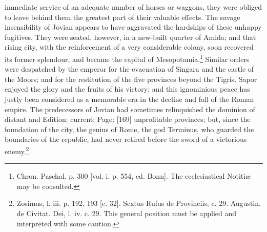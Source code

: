 immediate service of an adequate number of horses or waggons, they were obliged to leave behind them the greatest part of their valuable effects. The savage insensibility of Jovian appears to have aggravated the hardships of these unhappy fugitives. They were seated, however, in a new-built quarter of Amida; and that rising city, with the reinforcement of a very considerable colony, soon recovered its former splendour, and became the capital of Mesopotamia.\footnote{Chron. Paschal. p. 300 [vol. i. p. 554, ed. Bonn]. The ecclesiastical Notitiæ may be consulted.} Similar orders were despatched by the emperor for the evacuation of Singara and the castle of the Moors; and for the restitution of the five provinces beyond the Tigris. Sapor enjoyed the glory and the fruits of his victory; and this ignominious peace has justly been considered as a memorable era in the decline and fall of the Roman empire. The predecessors of Jovian had sometimes relinquished the dominion of distant and Edition: current; Page: [169] unprofitable provinces; but, since the foundation of the city, the genius of Rome, the god Terminus, who guarded the boundaries of the republic, had never retired before the sword of a victorious enemy.\footnote{Zosimus, l. iii. p. 192, 193 [c. 32]. Sextus Rufus de Provinciis, c. 29. Augustin. de Civitat. Dei, l. iv. c. 29. This general position must be applied and interpreted with some caution.}

